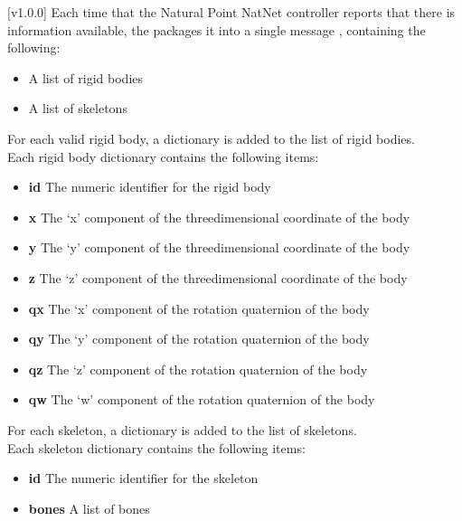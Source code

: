 [v1.0.0]
Each time that the Natural Point NatNet controller reports that there is information
available, the  packages it into a single message
\openSq{}\closeSq, containing the following:
\begin{itemize}
\item A list of rigid bodies
\item\exSp{}A list of skeletons
\end{itemize}

For each valid rigid body, a dictionary \openSq{}\closeSq{} is added to the
list of rigid bodies.\\

Each rigid body dictionary contains the following items:
\begin{itemize}
\item \textbf{id} \longDash{} The numeric identifier for the rigid body
\item\exSp\textbf{x} \longDash{} The `x' component of the three\longDash{}dimensional
coordinate of the body
\item\exSp\textbf{y} \longDash{} The `y' component of the three\longDash{}dimensional
coordinate of the body
\item\exSp\textbf{z} \longDash{} The `z' component of the three\longDash{}dimensional
coordinate of the body
\item\exSp\textbf{qx} \longDash{} The `x' component of the rotation quaternion of the body
\item\exSp\textbf{qy} \longDash{} The `y' component of the rotation quaternion of the body
\item\exSp\textbf{qz} \longDash{} The `z' component of the rotation quaternion of the body
\item\exSp\textbf{qw} \longDash{} The `w' component of the rotation quaternion of the body
\end{itemize}

For each skeleton, a dictionary is added to the list of skeletons.\\

Each skeleton dictionary contains the following items:
\begin{itemize}
\item \textbf{id} \longDash{} The numeric identifier for the skeleton
\item\exSp\textbf{bones} \longDash{} A list of bones
\end{itemize}

